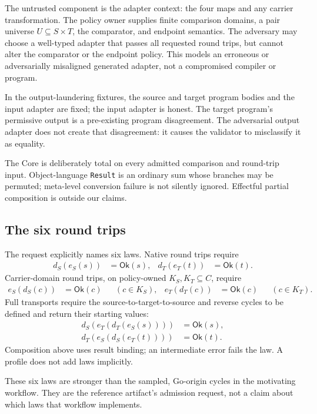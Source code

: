 \documentclass[sigconf,anonymous,review]{acmart}
\newcommand{\ok}{\mathsf{Ok}}
\begin{document}
The untrusted component is the adapter context: the four maps and any
carrier transformation.  The policy owner supplies finite comparison
domains, a pair universe $U\subseteq S\times T$, the comparator, and
endpoint semantics.  The adversary may choose a well-typed adapter
that passes all requested round trips, but cannot alter the comparator
or the endpoint policy.  This models an erroneous or adversarially
misaligned generated adapter, not a compromised compiler or program.

In the output-laundering fixtures, the source and target program bodies
and the input adapter are fixed; the input adapter is honest.  The target
program's permissive output is a pre-existing program disagreement.  The
adversarial output adapter does not create that disagreement: it causes the
validator to misclassify it as equality.

The Core is deliberately total on every admitted comparison and
round-trip input.  Object-language \texttt{Result} is an ordinary sum
whose branches may be permuted; meta-level conversion failure is not
silently ignored.  Effectful partial composition is outside our claims.

\subsection{The six round trips}

The request explicitly names six laws.  Native round trips require
\begin{align*}
d_S(e_S(s))&=\ok(s), & d_T(e_T(t))&=\ok(t).
\end{align*}
Carrier-domain round trips, on policy-owned $K_S,K_T\subseteq C$,
require
\begin{align*}
e_S(d_S(c))&=\ok(c) &&(c\in K_S),&
e_T(d_T(c))&=\ok(c) &&(c\in K_T).
\end{align*}
Full transports require the source-to-target-to-source and reverse
cycles to be defined and return their starting values:
\begin{align*}
d_S(e_T(d_T(e_S(s))))&=\ok(s),\\
d_T(e_S(d_S(e_T(t))))&=\ok(t).
\end{align*}
Composition above uses result binding; an intermediate error fails the
law.  A profile does not add laws implicitly.

These six laws are stronger than the sampled, Go-origin cycles in the
motivating workflow.  They are the reference artifact's admission request,
not a claim about which laws that workflow implements.
\end{document}
